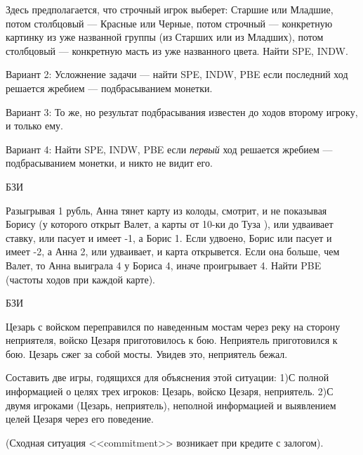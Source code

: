 \begin{problem}
Здесь предполагается, что строчный игрок выберет: Старшие
или Младшие, потом столбцовый --- Красные или Черные, потом
строчный --- конкретную картинку из уже названной группы (из
Старших или из Младших), потом столбцовый --- конкретную
масть из уже названного цвета. Найти SPE, INDW.

Вариант 2: Усложнение задачи --- найти SPE, INDW, PBE если
последний ход решается жребием --- подбрасыванием монетки.

Вариант 3: То же, но результат подбрасывания известен до
ходов второму игроку, и только ему.

Вариант 4: Найти SPE, INDW, PBE если {\em первый} ход
решается жребием --- подбрасыванием монетки, и никто не видит
его.






\begin{sol}

\end{sol}
\end{problem}




\begin{problem} 
\begin{source}
БЗИ
\end{source}
 Разыгрывая 1
рубль, Анна тянет карту из колоды, смотрит, и не показывая
Борису (у которого открыт Валет, а карты от 10-ки до Туза ), или
удваивает ставку, или пасует и имеет -1, а Борис 1. Если
удвоено, Борис или пасует и имеет -2, а Анна 2, или удваивает, и
карта открывется. Если она больше, чем Валет, то Анна выиграла 4
у Бориса 4, иначе проигрывает 4. Найти PBE (частоты ходов при
каждой карте).

\begin{sol}
\end{sol}
\end{problem}




\begin{problem} 
\begin{source}
БЗИ
\end{source} Цезарь с войском
переправился по наведенным мостам через реку на сторону
неприятеля, войско Цезаря приготовилось к бою. Неприятель
приготовился к бою. Цезарь сжег за собой мосты. Увидев это,
неприятель бежал.

Составить две игры, годящихся для объяснения этой ситуации:
1)С полной информацией о целях трех игроков: Цезарь, войско
Цезаря, неприятель. 2)С двумя игроками (Цезарь,
неприятель), неполной информацией и выявлением целей Цезаря
через его поведение.

(Сходная ситуация <<commitment>> возникает при кредите с
залогом).

\begin{sol}

\end{sol}
\end{problem}





